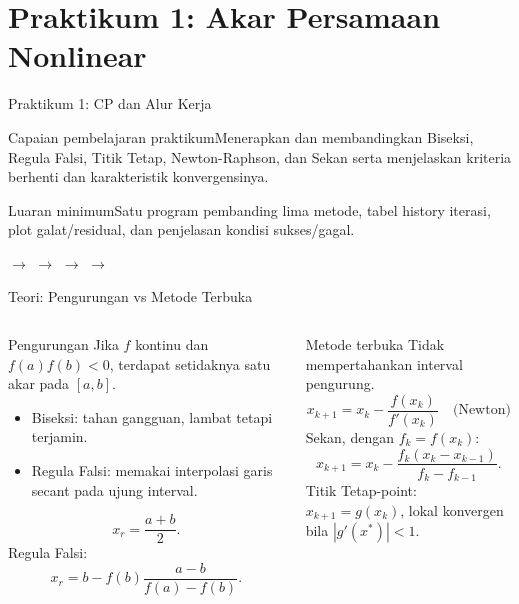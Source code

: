 \documentclass[slides,english,noindex,lean,nobackpage,nocopyright,noupdate,nosummary]{enacom}
\newcommand{\CPBox}[1]{\begin{block}{Capaian pembelajaran praktikum}#1\end{block}}
\newcommand{\OutBox}[1]{\begin{exampleblock}{Luaran minimum}#1\end{exampleblock}}
\begin{document}
\section{Praktikum 1: Akar Persamaan Nonlinear}

\begin{frame}{Praktikum 1: CP dan Alur Kerja}
\CPBox{Menerapkan dan membandingkan Biseksi, Regula Falsi, Titik Tetap, Newton-Raphson, dan Sekan serta menjelaskan kriteria berhenti dan karakteristik konvergensinya.}
\OutBox{Satu program pembanding lima metode, tabel history iterasi, plot galat/residual, dan penjelasan kondisi sukses/gagal.}
\begin{center}
 $\rightarrow$  $\rightarrow$  $\rightarrow$  $\rightarrow$ 
\end{center}
\end{frame}

\begin{frame}{Teori: Pengurungan vs Metode Terbuka}
\begin{columns}[T]
\begin{block}{Pengurungan}
Jika $f$ kontinu dan $f(a)f(b)<0$, terdapat setidaknya satu akar pada $[a,b]$.
\begin{itemize}
\item Biseksi: tahan gangguan, lambat tetapi terjamin.
\item Regula Falsi: memakai interpolasi garis secant pada ujung interval.
\end{itemize}
\[
x_r=\frac{a+b}{2}.
\]
Regula Falsi:
\[
x_r=b-f(b)\frac{a-b}{f(a)-f(b)}.
\]
\end{block}
\begin{block}{Metode terbuka}
Tidak mempertahankan interval pengurung.
\[
x_{k+1}=x_k-\frac{f(x_k)}{f'(x_k)}\quad\text{(Newton)}
\]
Sekan, dengan $f_k=f(x_k)$:
\[
x_{k+1}=x_k-\frac{f_k(x_k-x_{k-1})}{f_k-f_{k-1}}.
\]
Titik Tetap-point: $x_{k+1}=g(x_k)$, lokal konvergen bila $|g'(x^*)|<1$.
\end{block}
\end{columns}
\end{frame}
\end{document}
